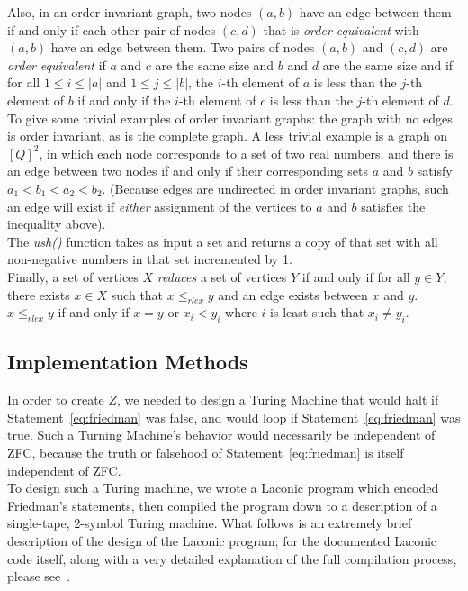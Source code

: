 \documentclass[11pt]{article}
\begin{document}
Also, in an order invariant graph, two nodes $(a,b)$ have an edge between them if and only if each other pair of nodes $(c,d)$ that is \emph{order equivalent} with $(a,b)$ have an edge between them. Two pairs of nodes $(a, b)$ and $(c, d)$ are \emph{order equivalent} if $a$ and $c$ are the same size and $b$ and $d$ are the same size and if for all $1 \le i \le |a|$ and $1 \le j \le |b|$, the $i$-th element of $a$ is less than the $j$-th element of $b$ if and only if the $i$-th element of $c$ is less than the $j$-th element of $d$. \\

To give some trivial examples of order invariant graphs: the graph with no edges is order invariant, as is the complete graph. A less trivial example is a graph on $[Q]^2$, in which each node corresponds to a set of two real numbers, and there is an edge between two nodes if and only if their corresponding sets $a$ and $b$ satisfy $a_1 < b_1 < a_2 < b_2$. (Because edges are undirected in order invariant graphs, such an edge will exist if \emph{either} assignment of the vertices to $a$ and $b$ satisfies the inequality above). \\

The \emph{ush()} function takes as input a set and returns a copy of that set with all non-negative numbers in that set incremented by 1. \\ 

Finally, a set of vertices $X$ \emph{reduces} a set of vertices $Y$ if and only if for all $y \in Y$, there exists $x \in X$ such that $x \le_{rlex} y$ and an edge exists between $x$ and $y$. $x \le_{rlex} y$ if and only if $x = y$ or $x_i < y_i$ where $i$ is least such that $x_i \not= y_i$.~\cite{personalcomm} \\

\subsection{Implementation Methods}

In order to create $Z$, we needed to design a Turing Machine that would halt if Statement~\ref{eq:friedman} was false, and would loop if Statement~\ref{eq:friedman} was true. Such a Turning Machine's behavior would necessarily be independent of ZFC, because the truth or falsehood of  Statement~\ref{eq:friedman} is itself independent of ZFC.~\cite{friedman} \\

To design such a Turing machine, we wrote a Laconic program which encoded Friedman's statements, then compiled the program down to a description of a single-tape, 2-symbol Turing machine. What follows is an extremely brief description of the design of the Laconic program; for the documented Laconic code itself, along with a very detailed explanation of the full compilation process, please see~\cite{ref:github}. \\
\end{document}

